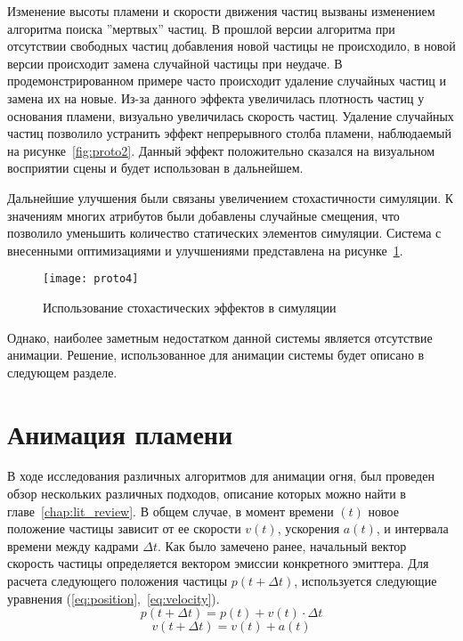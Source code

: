 Изменение высоты пламени и скорости движения частиц вызваны изменением алгоритма
поиска ''мертвых'' частиц. В прошлой версии алгоритма при отсутствии свободных
частиц добавления новой частицы не происходило, в новой версии происходит замена
случайной частицы при неудаче. В продемонстрированном примере часто происходит
удаление случайных частиц и замена их на новые. Из-за данного эффекта
увеличилась плотность частиц у основания пламени, визуально увеличилась скорость
частиц. Удаление случайных частиц позволило устранить эффект непрерывного столба
пламени, наблюдаемый на рисунке~\ref{fig:proto2}. Данный эффект положительно
сказался на визуальном восприятии сцены и будет использован в дальнейшем.

Дальнейшие улучшения были связаны увеличением стохастичности симуляции. К
значениям многих атрибутов были добавлены случайные смещения, что позволило
уменьшить количество статических элементов симуляции. Система с внесенными
оптимизациями и улучшениями представлена на рисунке~\ref{fig:proto4}.
\begin{figure}[htb]
	\centering
    \texttt{[image: proto4]}
    \caption{Использование стохастических эффектов в симуляции}%
    \label{fig:proto4}
\end{figure}
Однако, наиболее заметным недостатком данной системы является отсутствие
анимации. Решение, использованное для анимации системы будет описано в следующем
разделе.

\section{Анимация пламени}

В ходе исследования различных алгоритмов для анимации огня, был проведен обзор
нескольких различных подходов, описание которых можно найти в
главе~\ref{chap:lit_review}. В общем случае, в момент времени $(t)$ новое
положение частицы зависит от ее скорости $v(t)$, ускорения $a(t)$, и интервала
времени между кадрами $\Delta t$. Как было замечено ранее, начальный вектор
скорость частицы определяется вектором эмиссии конкретного эмиттера. Для расчета
следующего положения частицы $p(t + \Delta{t})$, используется следующие
уравнения (\ref{eq:position},~\ref{eq:velocity}).
\begin{equation}
  \label{eq:position}
  p(t + \Delta{t}) = p(t) + v(t) \cdot \Delta{t}
\end{equation}
\begin{equation}
  \label{eq:velocity}
  v(t + \Delta{t}) = v(t) + a(t)
\end{equation}

